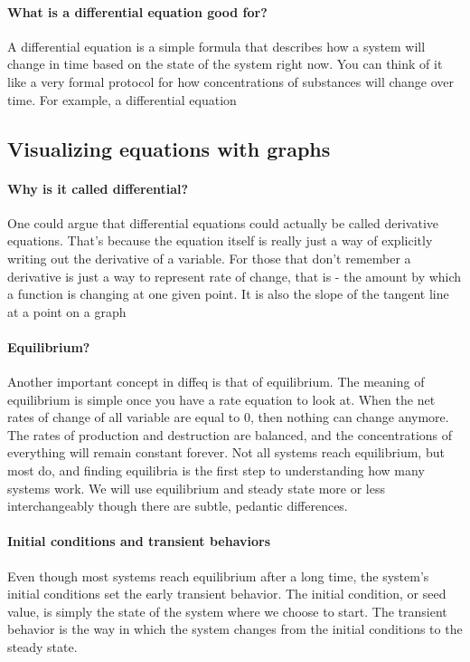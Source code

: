 \paragraph{What is a differential equation good for?} A differential equation is a simple formula that describes how a system will change in time based on the state of the system right now. You can think of it like a very formal protocol for how concentrations of substances will change over time.  For example, a differential equation 

% 



\subsection{Visualizing equations with graphs}
\paragraph{Why is it called differential?} One could argue that differential equations could actually be called derivative equations.  That's because the equation itself is really just a way of explicitly writing out the derivative of a variable.  For those that don't remember a derivative is just a way to represent rate of change, that is - the amount by which a function is changing at one given point. It is also the slope of the tangent line at a point on a graph

\paragraph{Equilibrium?} Another important concept in diffeq is that of equilibrium.  The meaning of equilibrium is simple once you have a rate equation to look at.  When the net rates of change of all variable are equal to 0, then nothing can change anymore.  The rates of production and destruction are balanced, and the concentrations of everything will remain constant forever.  Not all systems reach equilibrium, but most do, and finding equilibria is the first step to understanding how many systems work.  We will use equilibrium and steady state more or less interchangeably though there are subtle, pedantic differences.

\paragraph{Initial conditions and transient behaviors} Even though most systems reach equilibrium after a long time, the system's initial conditions set the early transient behavior. The initial condition, or seed value, is simply the state of the system where we choose to start.  The transient behavior is the way in which the system changes from the initial conditions to the steady state.

